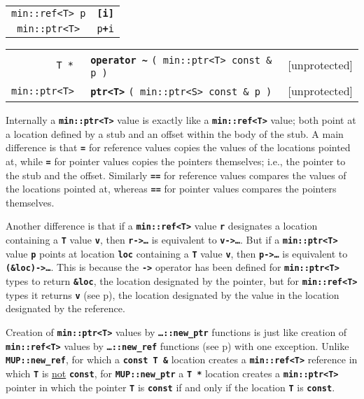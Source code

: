\documentclass[12pt]{article}
\makeatletter
\newcommand{\TT}[1]{{\tt \bfseries #1}}
\newcommand{\ttbmkey}[2]{\TT{[#1]}\index{[]@{\tt [#1]}!#2}}
\newcommand{\ttindex}[1]{\index{#1@{\tt #1}}}
\newcommand{\ttomkey}[3]{\TT{operator #2}\index{#1@{\tt operator #2}!{#3}}}
\newcommand{\ttmokey}[2]{\TT{#1}\index{#1@{\tt operator #1}!{#2}}}
\newcommand{\pagref}[1]{p\pageref{#1}}
\newcommand{\EOL}{\penalty \exhyphenpenalty}
\newenvironment{indpar}[1][0.3in]%
	{\begin{list}{}%
		     {\setlength{\itemsep}{0in}%
		      \setlength{\topsep}{0in}%
		      \setlength{\parsep}{1ex}%
		      \setlength{\labelwidth}{#1}%
		      \setlength{\leftmargin}{#1}%
		      \addtolength{\leftmargin}{\labelsep}}%
	 \item}%
	{\end{list}}
\newcommand{\LABEL}[1]{\label{#1}}
\newcommand{\TTBMKEY}[2]{\ttbmkey{#1}{#2}}
\newcommand{\TTOMKEY}[3]{\ttomkey{#1}{#2}{#3}}
\newcommand{\TTMOKEY}[2]{\ttmokey{#1}{#2}}
\newcommand{\MINKEY}[1]%
	   {\TT{#1}\ttindex{min::#1}\ttindex{#1}}
\makeatother
\begin{document}
\begin{indpar}\begin{tabular}{r@{}l}
\verb|min::ref<T> p| & \TTBMKEY{i}{of {\tt min::ptr}}
\LABEL{MIN::PTR_[]} \\
\verb|min::ptr<T> |
    & \verb|p|\TTMOKEY{+}{of {\tt min::ptr}}\verb|i|
\LABEL{MIN::PTR_+} \\
\end{tabular}\end{indpar}

\begin{indpar}\begin{tabular}{r@{}ll}
\verb|T * |
	& \TTOMKEY{\textasciitilde}{\textasciitilde}{of {\tt min::ptr<T>}}
	  \verb|( min::ptr<T> const & p )| & [unprotected]
\LABEL{MIN::TILDE_OF_PTR} \\
\verb|min::ptr<T> |
	& \MINKEY{ptr<T>}
	   \verb|( min::ptr<S> const & p )| & [unprotected]
\LABEL{MIN::PTR_OF_PTR} \\
\end{tabular}\end{indpar}

Internally a \TT{min::\EOL ptr<T>} value is exactly like a
\TT{min::\EOL ref<T>} value; both point at a location defined by
a stub and an offset within the body of the stub.
A main difference is that \TT{=} for reference values copies the
values of the locations pointed at, while \TT{=} for pointer values
copies the pointers themselves; i.e., the pointer to the stub and the offset.
Similarly \TT{==} for reference values compares the values of
the locations pointed at, whereas \TT{==} for pointer values
compares the pointers themselves.

Another difference is that if a \TT{min::\EOL ref<T>} value \TT{r}
designates a location containing a \TT{T} value \TT{v}, then
\TT{r->\ldots}\label{PTR->} is equivalent to \TT{v->\ldots}.
But if a \TT{min::\EOL ptr<T>} value \TT{p}
points at location \TT{loc} containing a \TT{T} value \TT{v}, then
\TT{p->\ldots} is equivalent to \TT{(\&loc)->\ldots}.
This is because
the \TT{->} operator has been defined for \TT{min::\EOL ptr<T>}
types to return \TT{\&loc}, the location designated by the pointer,
but for \TT{min::\EOL ref<T>} types
it returns \TT{v} (see \pagref{REF->}), the location designated by
the value in the location designated by the reference.

Creation of \TT{min::\EOL ptr<T>} values by \TT{\ldots::new\_\EOL ptr}
functions is just like
creation of \TT{min::\EOL ref<T>} values by \TT{\ldots::new\_\EOL ref}
functions (see \pagref{NEW_REF_USAGE}) with one exception.
Unlike \TT{MUP::\EOL new\_\EOL ref}, for which a \TT{const~T~\&}
location creates a \TT{min::\EOL ref<T>} reference in which \TT{T}
is \underline{not} \TT{const},
for \TT{MUP::\EOL new\_\EOL ptr}
a \TT{T~*} location creates a \TT{min::\EOL ptr<T>} pointer in which
the pointer \TT{T} is \TT{const} if and only if the location \TT{T}
is \TT{const}.
\end{document}
